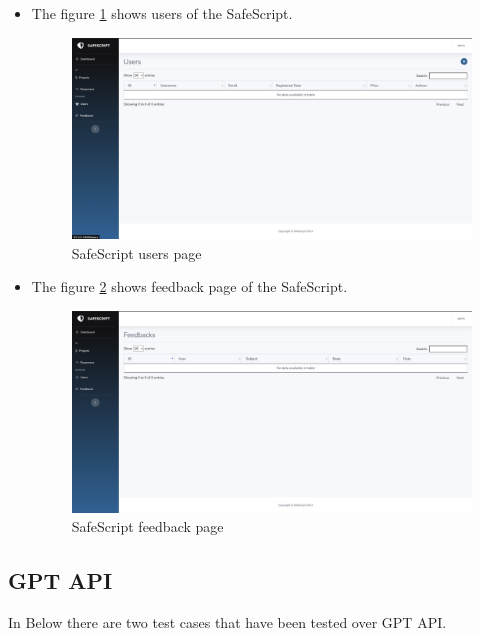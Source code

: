 \begin{itemize}
    \item The figure \ref{img:users} shows users of the SafeScript.
    \begin{figure}[H]
        \centering
        \includegraphics[width=0.6\linewidth]{images/users.png}
        \caption{SafeScript users page}
        \label{img:users}
    \end{figure}
    \item The figure \ref{img:feedback} shows feedback page of the SafeScript.
    \begin{figure}[H]
        \centering
        \includegraphics[width=0.6\linewidth]{images/feedback.png}
        \caption{SafeScript feedback page}
        \label{img:feedback}
    \end{figure}


\end{itemize}

\subsection{GPT API}
In Below there are two test cases that have been tested over GPT API.

